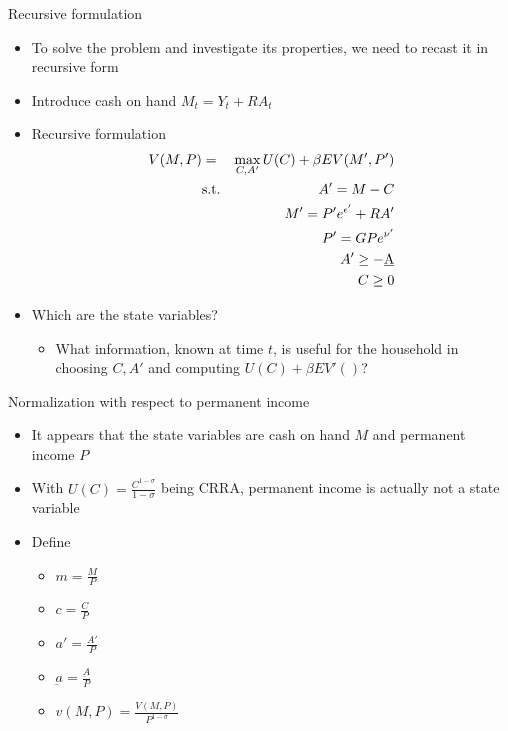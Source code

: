\documentclass[9pt]{beamer}
\newcommand{\bit}{\begin{itemize}}
\newcommand{\eit}{\end{itemize}}
\begin{document}
\begin{frame}{Recursive formulation}

\bit
\setlength\itemsep{1em}

\item To solve the problem and investigate its properties, we need to recast it in recursive form

\item Introduce cash on hand $M_t = Y_t + RA_t$

\item Recursive formulation
\begin{eqnarray}
V({\color{black}M, P}) &=& \max_{C, A'} U(C) + \beta E V({\color{black}M', P'}) \nonumber \\
&\text{s.t.}& A'=M-C \nonumber \\
&& M' = P'e^{\epsilon'} + RA' \nonumber \\
&& P' = GPe^{\nu'} \nonumber \\
&& A'\geq -\underbar A \nonumber \\
&& C\geq 0 \nonumber
\end{eqnarray}

\item Which are the state variables?
\bit
\item What information, known at time $t$, is useful for the household in choosing $C, A'$ and computing $U(C)+\beta E V'()$?
\eit

\eit

\end{frame}

\begin{frame}{Normalization with respect to permanent income}

\bit
\setlength\itemsep{1.5em}

\item It appears that the state variables are cash on hand $M$ and permanent income $P$

\item With $U(C)=\frac{C^{1-\sigma}}{1-\sigma}$ being CRRA, permanent income is actually not a state variable

\item Define
\bit
\setlength\itemsep{0.3em}
	\item $m=\frac{M}{P}$
	\item $c=\frac{C}{P}$
	\item $a'=\frac{A'}{P}$
	\item $\underbar a=\frac{\underbar A}{P}$
	\item $v(M, P)=\frac{V(M, P)}{P^{1-\sigma}}$
\eit


\eit

\end{frame}
\end{document}

